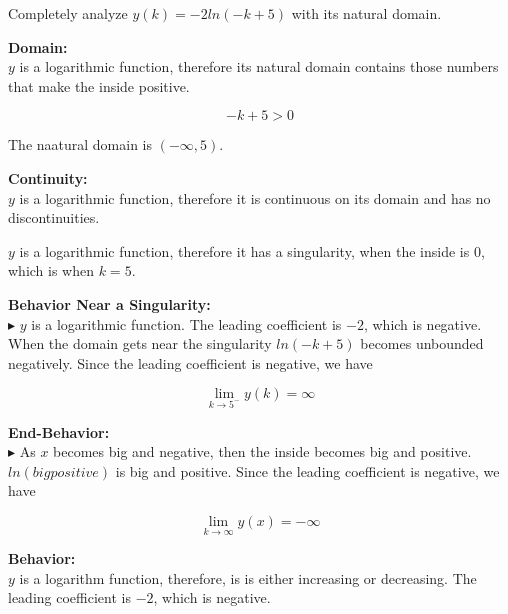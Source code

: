 \documentclass{ximera}
\author{Lee Wayand}
\begin{document}
\begin{exercise}



Completely analyze $y(k) = -2 ln(-k+5)$ with its natural domain.



\textbf{\textcolor{blue!55!black}{Domain:}}  \\

$y$ is a logarithmic function, therefore its natural domain contains those numbers that make the inside positive. 

\[
-k + 5 > 0
\]

The naatural domain is $(-\infty, 5)$.




\textbf{\textcolor{blue!55!black}{Continuity:}}  \\

$y$ is a logarithmic function, therefore it is continuous on its domain and has no discontinuities.


$y$ is a logarithmic function, therefore it has a singularity, when the inside is $0$, which is when $k = 5$.




\textbf{\textcolor{blue!55!black}{Behavior Near a Singularity:}}  \\



$\blacktriangleright$ $y$ is a logarithmic function. The leading coefficient is $-2$, which is negative.  When the domain gets near the singularity $ln(-k+5)$ becomes unbounded negatively.  Since the leading coefficient is negative, we have

\[
\lim\limits_{k \to 5^-} y(k) = \infty
\]





\textbf{\textcolor{blue!55!black}{End-Behavior:}}  \\


$\blacktriangleright$ As $x$ becomes big and negative, then the inside becomes big and positive.  $ln(big positive)$  is big and positive.  Since the leading coefficient is negative, we have

\[
\lim\limits_{k \to \infty} y(x) = -\infty
\]








\textbf{\textcolor{blue!55!black}{Behavior:}}  \\

$y$ is a logarithm function, therefore, is is either increasing or decreasing.  The leading coefficient is $-2$, which is negative.  



\end{exercise}
\end{document}
